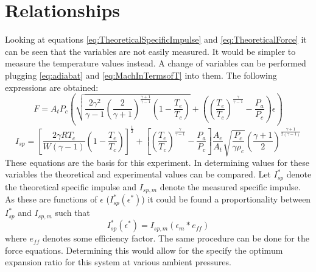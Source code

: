 \section{Relationships}\label{sec:Relationships}
Looking at equations \ref{eq:TheoreticalSpecificImpulse} and \ref{eq:TheoreticalForce} it can be seen that the variables are not easily measured. It would be simpler to measure the temperature values instead. A change of variables can be performed plugging \ref{eq:adiabat} and \ref{eq:MachInTermsofT} into them. The following expressions are obtained:
\begin{equation}\label{eq:RelevantNozzleForce}
F = A_t P_c \left(\sqrt{\frac{2\gamma^2}{\gamma-1}\left(\frac{2}{\gamma+1}\right)^{\frac{\gamma+1}{\gamma-1}}\left(1-\frac{T_e}{T_c}\right)}+\left(\left(\frac{T_e}{T_c}\right)^{\frac{\gamma}{\gamma-1}}-\frac{P_a}{P_c}\right)\epsilon\right)
\end{equation}
\begin{equation}\label{eq:RelevantIsp}
I_{sp}=\left[\frac{2\gamma R T_c}{W(\gamma-1)}\left(1-\frac{T_e}{T_c}\right)\right]^{\frac{1}{2}}+\left[\left(\frac{T_e}{T_c}\right)^{\frac{\gamma}{\gamma-1}}-\frac{P_a}{P_c}\right]\frac{A_e}{A_t}\sqrt{\frac{P_c}{\gamma\rho_c}}\left(\frac{\gamma+1}{2}\right)^{\frac{\gamma+1}{2(\gamma-1)}}
\end{equation}
These equations are the basis for this experiment. In determining values for these variables the theoretical and experimental values can be compared. Let $I_{sp}^*$ denote the theoretical specific impulse and $I_{sp,m}$ denote the measured specific impulse. As these are functions of $\epsilon$ ($I_{sp}^*(\epsilon^*)$) it could be found a proportionality between $I_{sp}^*$ and $I_{sp,m}$ such that
\begin{equation}
I_{sp}^*(\epsilon^*)=I_{sp,m}(\epsilon_m*e_{ff})
\end{equation}%
%
%
%
%
%
where $e_{ff}$ denotes some efficiency factor. The same procedure can be done for the force equations. Determining this would allow for the specify the optimum expansion ratio for this system at various ambient pressures.